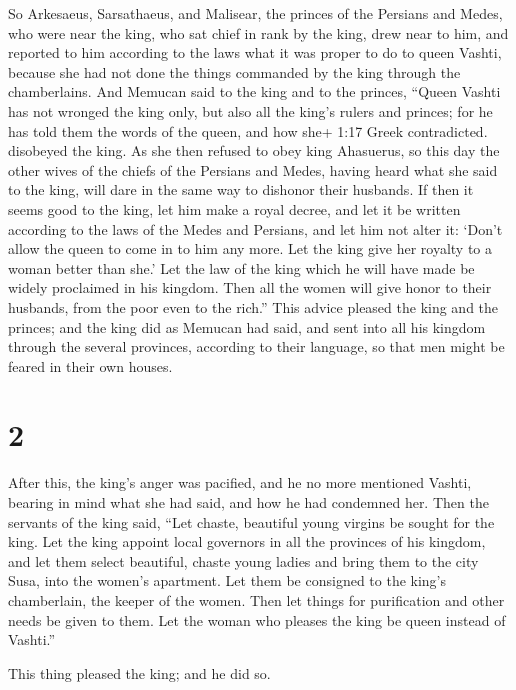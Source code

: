  So Arkesaeus, Sarsathaeus, and Malisear, the princes of
the Persians and Medes, who were near the king, who sat chief in rank by
the king, drew near to him,  and reported to him according
to the laws what it was proper to do to queen Vashti, because she had
not done the things commanded by the king through the chamberlains.
 And Memucan said to the king and to the princes, ``Queen
Vashti has not wronged the king only, but also all the king's rulers and
princes;  for he has told them the words of the queen, and
how she+ 1:17 Greek contradicted. disobeyed the king. As she then
refused to obey king Ahasuerus,  so this day the other
wives of the chiefs of the Persians and Medes, having heard what she
said to the king, will dare in the same way to dishonor their husbands.
 If then it seems good to the king, let him make a royal
decree, and let it be written according to the laws of the Medes and
Persians, and let him not alter it: `Don't allow the queen to come in to
him any more. Let the king give her royalty to a woman better than she.'
 Let the law of the king which he will have made be widely
proclaimed in his kingdom. Then all the women will give honor to their
husbands, from the poor even to the rich.''  This advice
pleased the king and the princes; and the king did as Memucan had said,
 and sent into all his kingdom through the several
provinces, according to their language, so that men might be feared in
their own houses.

\hypertarget{section-1}{%
\section{2}\label{section-1}}

 After this, the king's anger was pacified, and he no more
mentioned Vashti, bearing in mind what she had said, and how he had
condemned her.  Then the servants of the king said, ``Let
chaste, beautiful young virgins be sought for the king.  Let
the king appoint local governors in all the provinces of his kingdom,
and let them select beautiful, chaste young ladies and bring them to the
city Susa, into the women's apartment. Let them be consigned to the
king's chamberlain, the keeper of the women. Then let things for
purification and other needs be given to them.  Let the
woman who pleases the king be queen instead of Vashti.''

This thing pleased the king; and he did so.

